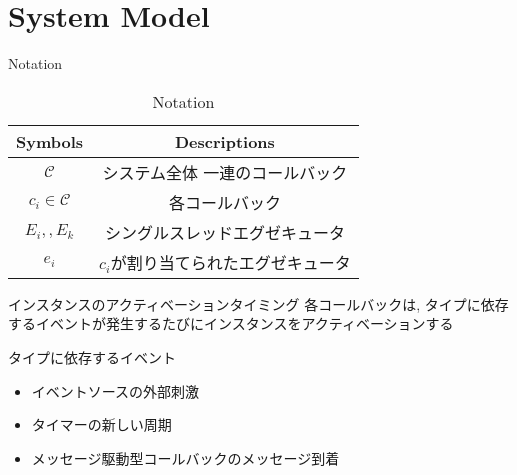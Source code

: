\section{System Model}
\label{sec: system_model}

\begin{frame}{Notation}
    \begin{table}[h]
        \centering\begin{tabular}{|c|c|}\hline
            \textbf{Symbols}      & \textbf{Descriptions}               \\\hline
            $\mathcal{C}$         & システム全体 一連のコールバック    \\\hline
            $c_i \in \mathcal{C}$ & 各コールバック                      \\\hline
            $E_i, , E_k$       & シングルスレッドエグゼキュータ      \\\hline
            $e_i$                 & $c_i$が割り当てられたエグゼキュータ \\\hline
        \end{tabular}
        \caption{Notation}
        \label{tab: notation}
    \end{table}
\end{frame}

\begin{frame}{インスタンスのアクティベーションタイミング}
    各コールバックは, タイプに依存するイベントが発生するたびにインスタンスをアクティベーションする

    \begin{block}{タイプに依存するイベント}
        \begin{itemize}
            \item イベントソースの外部刺激
            \item タイマーの新しい周期
            \item メッセージ駆動型コールバックのメッセージ到着
        \end{itemize}
    \end{block}
\end{frame}
